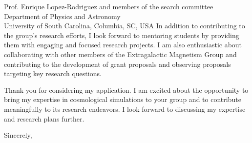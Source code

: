 \documentclass[11pt]{letter}
\begin{document}
\begin{letter}{Prof. Enrique Lopez-Rodriguez and members of the search committee \\ Department of Physics and Astronomy \\ University of South Carolina, Columbia, SC, USA}
In addition to contributing to the group's research efforts, I look forward to mentoring students by providing them with engaging and focused research projects. I am also enthusiastic about collaborating with other members of the Extragalactic Magnetism Group and contributing to the development of grant proposals and observing proposals targeting key research questions.

Thank you for considering my application. I am excited about the opportunity to bring my expertise in cosmological simulations to your group and to contribute meaningfully to its research endeavors. I look forward to discussing my expertise and research plans further.

\closing{Sincerely,}

\end{letter}
\end{document}
